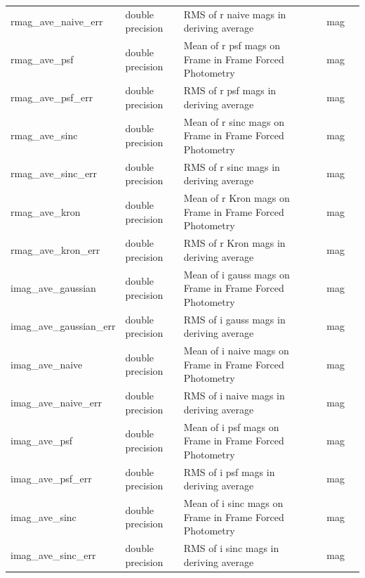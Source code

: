 \documentclass[12pt]{article}
\begin{document}
\begin{table}[thbp]
\begin{center}
{\begin{tabular}{llllll}
rmag\_ave\_naive\_err & double precision & RMS of r naive mags in deriving average               &                        & mag            &   \\
rmag\_ave\_psf & double precision & Mean of r psf mags on Frame in Frame Forced Photometry      &                        & mag            &   \\
rmag\_ave\_psf\_err & double precision & RMS of r psf mags in deriving average               &                        & mag            &   \\
rmag\_ave\_sinc & double precision & Mean of r sinc mags on Frame in Frame Forced Photometry      &                        & mag            &   \\
rmag\_ave\_sinc\_err & double precision & RMS of r sinc mags in deriving average               &                        & mag            &   \\
rmag\_ave\_kron & double precision & Mean of r Kron mags on Frame in Frame Forced Photometry      &                        & mag            &   \\
rmag\_ave\_kron\_err & double precision & RMS of r Kron mags in deriving average               &                        & mag            &   \\
imag\_ave\_gaussian & double precision & Mean of i gauss mags on Frame in Frame Forced Photometry  &                        & mag            &   \\
imag\_ave\_gaussian\_err & double precision & RMS of i gauss mags in deriving average               &                        & mag            &   \\
imag\_ave\_naive & double precision & Mean of i naive mags on Frame in Frame Forced Photometry  &                        & mag            &   \\
imag\_ave\_naive\_err & double precision & RMS of i naive mags in deriving average               &                        & mag            &   \\
imag\_ave\_psf & double precision & Mean of i psf mags on Frame in Frame Forced Photometry      &                        & mag            &   \\
imag\_ave\_psf\_err & double precision & RMS of i psf mags in deriving average               &                        & mag            &   \\
imag\_ave\_sinc & double precision & Mean of i sinc mags on Frame in Frame Forced Photometry      &                        & mag            &   \\
imag\_ave\_sinc\_err & double precision & RMS of i sinc mags in deriving average               &                        & mag            &   \\

\end{tabular}}
\end{center}
\end{table}
\end{document}
